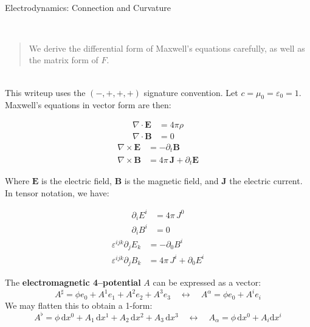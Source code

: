 \documentclass[12pt]{memoir}
\def\br{~\\[1em]}
\def\EE{\mathbf E}
\def\BB{\mathbf B}
\def\JJ{\mathbf J}
\def\dd{\mathrm d}
\def\pd{\partial}
\def\eps{\varepsilon}
\newcommand\dx[1]{\dd x^{#1}}
\begin{document}
~\\[-2em]
\begin{center}
\Large Electrodynamics: Connection and Curvature
\end{center}
~\\[-2em]
\begin{abstract}
\noindent
We derive the differential form of Maxwell's equations carefully,
as well as the matrix form of $F$.
\end{abstract}
~\\[0em]
This writeup uses the $(-, +, +, +)$ signature convention.
Let $c = \mu_0 = \eps_0 = 1$.
\br
Maxwell's equations in vector form are then:
\vspace*{-2em}
\begin{adjustwidth}{5cm}{5cm}
\begin{multicols}{2}
\begin{align*}
\nabla\cdot\EE &= 4\pi\rho\\
\nabla\cdot\BB &= 0
\end{align*}
\vfill
\columnbreak
\begin{align*}
\nabla\times\EE &= -\pd_t\BB\\
\nabla\times\BB &= 4\pi\,\JJ + \pd_t\EE
\end{align*}
\end{multicols}
\end{adjustwidth}
Where $\EE$ is the electric field, $\BB$ is the magnetic field,
and $\JJ$ the electric current.
\br
In tensor notation, we have:
\vspace*{-2em}
\begin{adjustwidth}{5cm}{5cm}
\begin{multicols}{2}
\begin{align*}
\pd_iE^i &= 4\pi\,J^0\\
\pd_iB^i &= 0
\end{align*}
\vfill
\columnbreak
\begin{align*}
\eps^{ijk}\pd_jE_k &= -\pd_0B^i\\
\eps^{ijk}\pd_jB_k &= 4\pi\,J^i + \pd_0E^i
\end{align*}
\end{multicols}
\end{adjustwidth}
The \textbf{electromagnetic 4--potential} $A$
can be expressed as a vector:
\[A^\sharp = \phi e_0 + A^1e_1 + A^2e_2 + A^3e_3
\quad\longleftrightarrow\quad
A^\alpha = \phi e_0 + A^ie_i\]
We may flatten this to obtain a 1-form:
\[A^\flat =
\phi\,\dx{0}
+ A_1\,\dx{1}
+ A_2\,\dx{2}
+ A_3\,\dx{3}
\quad\longleftrightarrow\quad
A_\alpha = \phi\,\dx{0} + A_i\dx{i}
\]
\end{document}
